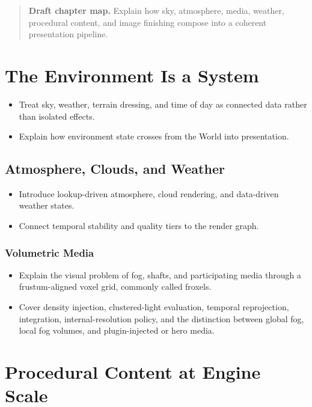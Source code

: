 \documentclass[
  11pt,
  letterpaper,
  DIV=11,
  numbers=noendperiod,
  twoside,
  open=right]{scrreprt}
\providecommand{\tightlist}{%
  \setlength{\itemsep}{0pt}\setlength{\parskip}{0pt}}
\begin{document}
\begin{quote}
\textbf{Draft chapter map.} Explain how sky, atmosphere, media, weather,
procedural content, and image finishing compose into a coherent
presentation pipeline.
\end{quote}

\section{The Environment Is a System}\label{the-environment-is-a-system}

\begin{itemize}
\tightlist
\item
  Treat sky, weather, terrain dressing, and time of day as connected
  data rather than isolated effects.
\item
  Explain how environment state crosses from the World into
  presentation.
\end{itemize}

\subsection{Atmosphere, Clouds, and
Weather}\label{atmosphere-clouds-and-weather}

\begin{itemize}
\tightlist
\item
  Introduce lookup-driven atmosphere, cloud rendering, and data-driven
  weather states.
\item
  Connect temporal stability and quality tiers to the render graph.
\end{itemize}

\subsubsection{Volumetric Media}\label{volumetric-media}

\begin{itemize}
\tightlist
\item
  Explain the visual problem of fog, shafts, and participating media
  through a frustum-aligned voxel grid, commonly called froxels.
\item
  Cover density injection, clustered-light evaluation, temporal
  reprojection, integration, internal-resolution policy, and the
  distinction between global fog, local fog volumes, and plugin-injected
  or hero media.
\end{itemize}

\section{Procedural Content at Engine
Scale}\label{procedural-content-at-engine-scale}
\end{document}

